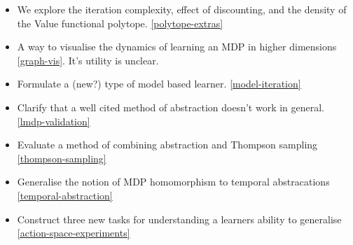 \begin{itemize}
  \tightlist
  \item We explore the iteration complexity, effect of discounting, and the density of the Value functional polytope. \ref{polytope-extras}
  \item A way to visualise the dynamics of learning an MDP in higher dimensions \ref{graph-vis}. It's utility is unclear.
  \item Formulate a (new?) type of model based learner. \ref{model-iteration}
  \item Clarify that a well cited method of abstraction doesn't work in general. \ref{lmdp-validation}
  \item Evaluate a method of combining abstraction and Thompson sampling \ref{thompson-sampling}
  \item Generalise the notion of MDP homomorphism to temporal abstracations \ref{temporal-abstraction}
  \item Construct three new tasks for understanding a learners ability to generalise \ref{action-space-experiments}
\end{itemize}
